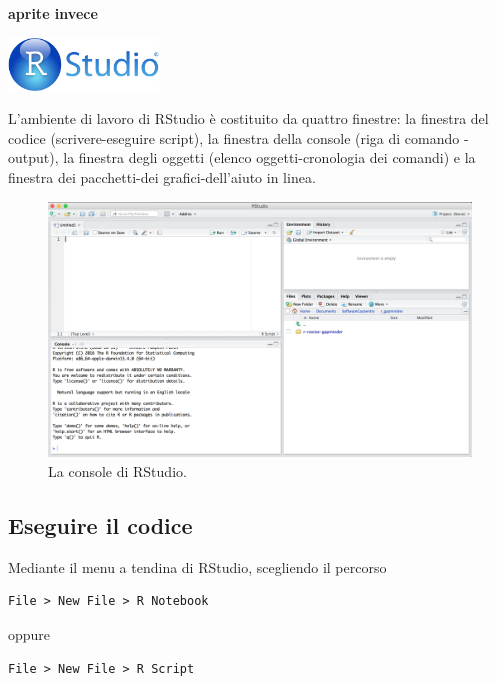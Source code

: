 \documentclass[
]{memoir}
\theoremstyle{definition}
\theoremstyle{definition}
\theoremstyle{definition}
\theoremstyle{definition}
\theoremstyle{remark}
\begin{document}
\textbf{aprite invece}

\includegraphics[width=0.3\textwidth,height=\textheight]{images/RStudio-Logo-Blue-Gradient.png}

L'ambiente di lavoro di RStudio è costituito da quattro finestre: la finestra del codice (scrivere-eseguire script), la finestra della console (riga di comando -
output), la finestra degli oggetti (elenco oggetti-cronologia dei
comandi) e la finestra dei pacchetti-dei grafici-dell'aiuto in linea.

\begin{figure}
\hypertarget{fig:rstudio_pics}{%
\centering
\includegraphics[width=1\textwidth,height=\textheight]{images/rstudio_pics.png}
\caption{La console di RStudio.}\label{fig:rstudio_pics}
}
\end{figure}

\hypertarget{eseguire-il-codice}{%
\subsection{Eseguire il codice}\label{eseguire-il-codice}}

Mediante il menu a tendina di RStudio, scegliendo il percorso

\begin{verbatim}
File > New File > R Notebook
\end{verbatim}

oppure

\begin{verbatim}
File > New File > R Script
\end{verbatim}
\end{document}
